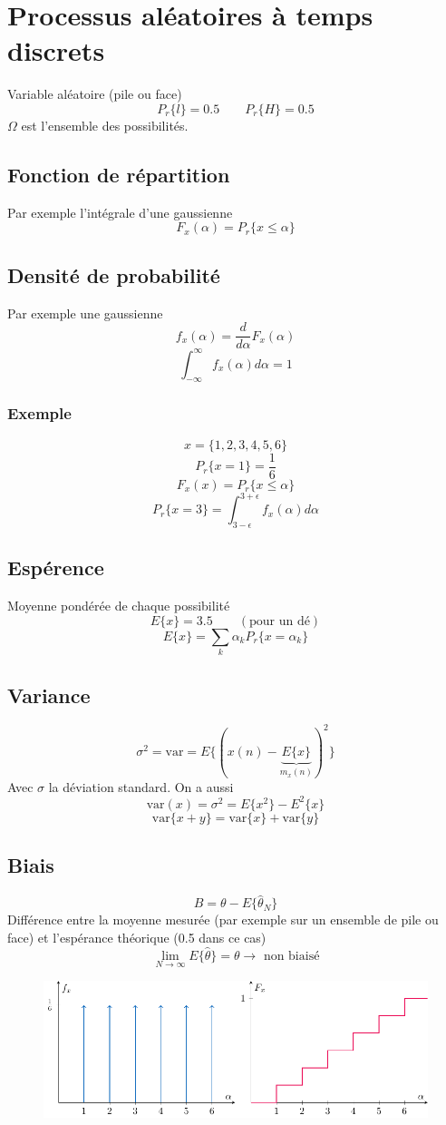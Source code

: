 \documentclass[resume]{subfiles}
\begin{document}
\section{Processus aléatoires à temps discrets}
Variable aléatoire (pile ou face)
$$P_r\lbrace l\rbrace = 0.5\qquad P_r\lbrace H\rbrace=0.5$$
$\Omega$ est l'ensemble des possibilités.\\
\subsection{Fonction de répartition}
Par exemple l'intégrale d'une gaussienne
$$F_x(\alpha)=P_r\lbrace x\leq \alpha\rbrace$$
\subsection{Densité de probabilité}
Par exemple une gaussienne
$$f_x(\alpha)=\frac{d}{d\alpha}F_x(\alpha)$$
$$\int_{-\infty}^{\infty}f_x(\alpha)d\alpha=1$$
\subsubsection{Exemple}
$$x=\lbrace 1,2,3,4,5,6\rbrace$$
$$P_r\lbrace x=1\rbrace=\frac{1}{6}$$
$$F_x(x)=P_r\lbrace x\leq \alpha\rbrace$$
$$P_r\lbrace x=3\rbrace =\int_{3-\epsilon}^{3+\epsilon}f_x(\alpha)d\alpha$$

\subsection{Espérence}
Moyenne pondérée de chaque possibilité
$$E\lbrace x\rbrace=3.5\qquad (\text{pour un dé})$$
$$E\lbrace x\rbrace=\sum_{k}\alpha_kP_r\lbrace x=\alpha_k\rbrace$$
\subsection{Variance}
$$\sigma^2=\text{var}=E\lbrace (x(n)-\underbrace{E\lbrace x\rbrace}_{m_x(n)})^2\rbrace$$
Avec $\sigma$ la déviation standard. On a aussi
$$\text{var}(x)=\sigma^2=E\lbrace x^2\rbrace-E^2\lbrace x\rbrace$$
$$\text{var}\lbrace x+y\rbrace=\text{var}\lbrace x\rbrace+\text{var}\lbrace y\rbrace$$
\subsection{Biais}
$$B=\theta-E\lbrace \hat{\theta}_N\rbrace$$
Différence entre la moyenne mesurée (par exemple sur un ensemble de pile ou face) et l'espérance théorique (0.5 dans ce cas)
$$\lim_{N\to\infty}E\lbrace \hat{\theta}\rbrace=\theta\longrightarrow \text{ non biaisé}$$
\begin{figure}[H]
\centering
\includegraphics[width=\columnwidth, page=1]{drwg_3.pdf}
\end{figure}
\end{document}
